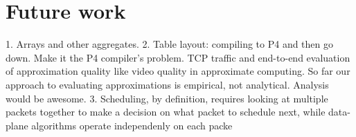 \section{Future work}
\label{s:future}
1. Arrays and other aggregates.
2. Table layout: compiling to P4 and then go down. Make it the P4 compiler's problem.
TCP traffic and end-to-end evaluation of approximation quality like video quality in approximate computing.
So far our approach to evaluating approximations is empirical, not analytical. Analysis would be awesome.
3. Scheduling, by definition, requires looking at multiple packets together to
make a decision on what packet to schedule next, while data-plane algorithms
operate independenly on each packe
